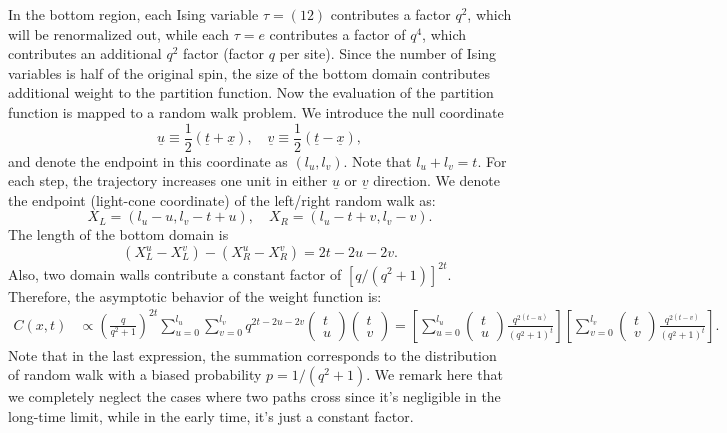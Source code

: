 \documentclass{SciPost}
\begin{document}
In the bottom region, each Ising variable $\tau = (12)$ contributes a factor $q^2$, which will be renormalized out, while each $\tau=e$ contributes a factor of $q^4$, which contributes an additional $q^2$ factor (factor $q$ per site).
Since the number of Ising variables is half of the original spin, the size of the bottom domain contributes additional weight to the partition function.
Now the evaluation of the partition function is mapped to a random walk problem.
We introduce the null coordinate
\begin{equation}
	\underline u \equiv \frac{1}{2}\left(\underline t + \underline x\right), \quad 
	\underline v \equiv \frac{1}{2}\left(\underline t - \underline x\right),
\end{equation}
and denote the endpoint in this coordinate as $(l_u, l_v)$.
Note that $l_u+l_v=t$.
For each step, the trajectory increases one unit in either $\underline u$ or $\underline v$ direction.
We denote the endpoint (light-cone coordinate) of the left/right random walk as:
\begin{equation}
	X_L = (l_u-u,l_v-t+u),\quad
	X_R = (l_u-t+v,l_v-v).
\end{equation}
The length of the bottom domain is
\begin{equation}
	(X_L^u-X_L^v)-(X_R^u-X_R^v) = 2t-2u-2v.
\end{equation}
Also, two domain walls contribute a constant factor of $\left[q/(q^2+1)\right]^{2t}$.
Therefore, the asymptotic behavior of the weight function is:
\begin{equation*}
\begin{aligned}
	C(x,t) &\propto \left(\frac{q}{q^2+1}\right)^{2t}\sum_{u=0}^{l_u} \sum_{v=0}^{l_v} q^{2t-2u-2v} 
	\begin{pmatrix} t \\ u \end{pmatrix} \begin{pmatrix} t \\ v \end{pmatrix} 
	= \left[\sum_{u=0}^{l_u}\begin{pmatrix} t \\ u \end{pmatrix} \frac{q^{2(t-u)}}{(q^2+1)^t} \right]
	\left[\sum_{v=0}^{l_v}\begin{pmatrix} t \\ v \end{pmatrix} \frac{q^{2(t-v)}}{(q^2+1)^t} \right].
\end{aligned}
\end{equation*}
Note that in the last expression, the summation corresponds to the distribution of random walk with a biased probability $p = 1/(q^2+1)$.
We remark here that we completely neglect the cases where two paths cross since it's negligible in the long-time limit, while in the early time, it's just a constant factor.
\end{document}
